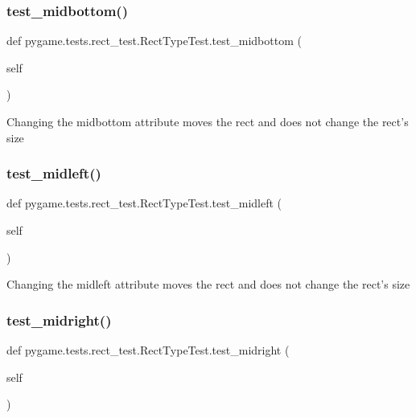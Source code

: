 \subsubsection{\texorpdfstring{test\+\_\+midbottom()}{test\_midbottom()}}
{\footnotesize\ttfamily def pygame.\+tests.\+rect\+\_\+test.\+Rect\+Type\+Test.\+test\+\_\+midbottom (\begin{DoxyParamCaption}\item[{}]{self }\end{DoxyParamCaption})}

\begin{DoxyVerb}Changing the midbottom attribute moves the rect and does not change
   the rect's size
\end{DoxyVerb}
 \mbox{\label{classpygame_1_1tests_1_1rect__test_1_1_rect_type_test_a83559c0e14eae79b8c9ca39896cd66e1}} 
\subsubsection{\texorpdfstring{test\+\_\+midleft()}{test\_midleft()}}
{\footnotesize\ttfamily def pygame.\+tests.\+rect\+\_\+test.\+Rect\+Type\+Test.\+test\+\_\+midleft (\begin{DoxyParamCaption}\item[{}]{self }\end{DoxyParamCaption})}

\begin{DoxyVerb}Changing the midleft attribute moves the rect and does not change
   the rect's size
\end{DoxyVerb}
 \mbox{\label{classpygame_1_1tests_1_1rect__test_1_1_rect_type_test_a644becb865224867d3d26adc57f90d18}} 
\subsubsection{\texorpdfstring{test\+\_\+midright()}{test\_midright()}}
{\footnotesize\ttfamily def pygame.\+tests.\+rect\+\_\+test.\+Rect\+Type\+Test.\+test\+\_\+midright (\begin{DoxyParamCaption}\item[{}]{self }\end{DoxyParamCaption})}

